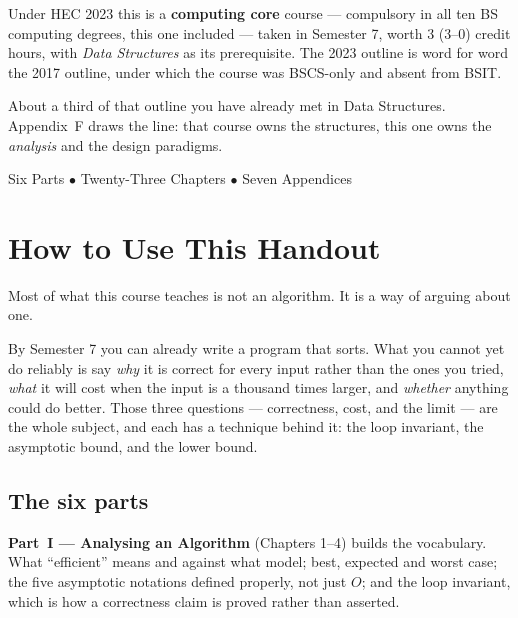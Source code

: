 \begin{center}
\begin{tcolorbox}[enhanced, width=0.86\textwidth, colback=lightbg,
  colframe=primary, boxrule=0pt, leftrule=4pt, arc=2pt, top=6pt, bottom=6pt]
\smallskip
Under HEC 2023 this is a \textbf{computing core} course --- compulsory in all
ten BS computing degrees, this one included --- taken in Semester 7, worth
3 (3--0) credit hours, with \emph{Data Structures} as its prerequisite. The
2023 outline is word for word the 2017 outline, under which the course was
BSCS-only and absent from BSIT.

\smallskip
About a third of that outline you have already met in Data Structures.
Appendix~F draws the line: that course owns the structures, this one owns the
\emph{analysis} and the design paradigms.
\end{tcolorbox}

\vspace{0.9cm}
{\small\color{gray!60!black}Six Parts $\bullet$ Twenty-Three Chapters $\bullet$ Seven Appendices}
\vspace{1cm}
\end{center}

\newpage

\chapter*{How to Use This Handout}

Most of what this course teaches is not an algorithm. It is a way of arguing
about one.

By Semester 7 you can already write a program that sorts. What you cannot yet
do reliably is say \emph{why} it is correct for every input rather than the
ones you tried, \emph{what} it will cost when the input is a thousand times
larger, and \emph{whether} anything could do better. Those three questions ---
correctness, cost, and the limit --- are the whole subject, and each has a
technique behind it: the loop invariant, the asymptotic bound, and the lower
bound.

\section*{The six parts}

\textbf{Part~I --- Analysing an Algorithm} (Chapters 1--4) builds the
vocabulary. What ``efficient'' means and against what model; best, expected and
worst case; the five asymptotic notations defined properly, not just $O$; and
the loop invariant, which is how a correctness claim is proved rather than
asserted.

